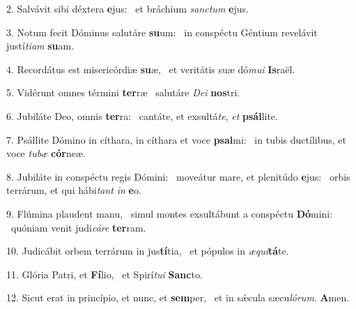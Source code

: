 2. Salvávit sibi déxtera \textbf{e}jus: \ast\  et bráchium \textit{sanc}\textit{tum} \textbf{e}jus.\

3. Notum fecit Dóminus salutáre \textbf{su}um: \ast\  in conspéctu Géntium revelávit justí\textit{ti}\textit{am} \textbf{su}am.\

4. Recordátus est misericórdiæ \textbf{su}æ, \ast\  et veritátis suæ dó\textit{mu}\textit{i} \textbf{Is}raël.\

5. Vidérunt omnes términi \textbf{ter}ræ \ast\  salutáre \textit{De}\textit{i} \textbf{nos}tri.\

6. Jubiláte Deo, omnis \textbf{ter}ra: \ast\  cantáte, et exsultá\textit{te}, \textit{et} \textbf{psál}lite.\

7. Psállite Dómino in cíthara, in cíthara et voce \textbf{psal}mi: \ast\  in tubis ductílibus, et voce \textit{tu}\textit{bæ} \textbf{cór}neæ.\

8. Jubiláte in conspéctu regis Dómini: \dag\  moveátur mare, et plenitúdo \textbf{e}jus: \ast\  orbis terrárum, et qui hábi\textit{tant} \textit{in} \textbf{e}o.\

9. Flúmina plaudent manu, \dag\  simul montes exsultábunt a conspéctu \textbf{Dó}mini: \ast\  quóniam venit judi\textit{cá}\textit{re} \textbf{ter}ram.\

10. Judicábit orbem terrárum in jus\textbf{tí}tia, \ast\  et pópulos in \textit{æ}\textit{qui}\textbf{tá}te.\

11. Glória Patri, et \textbf{Fí}lio, \ast\  et Spirí\textit{tu}\textit{i} \textbf{Sanc}to.\

12. Sicut erat in princípio, et nunc, et \textbf{sem}per, \ast\  et in sǽcula sæcu\textit{ló}\textit{rum}. \textbf{A}men.\

